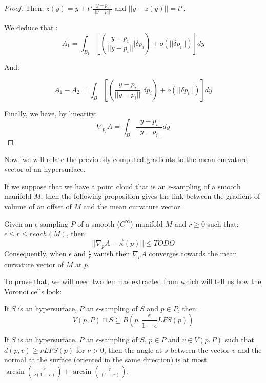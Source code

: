 \begin{proof}
Then, $ z(y) = y + t^{\star} \frac{y - p_i}{||y - p_i||} $ and $ || y - z(y) || =
t^{\star} $.

We deduce that :
$$ A_1 = \int_{B_1} \left[ \left( \frac{y - p_i}{||y - p_i||} | \delta p_i \right) +
o(||\delta p_i||) \right] dy $$

And:

$$ A_1 - A_2 = \int_{B} \left[ \left( \frac{y - p_i}{||y - p_i||} | \delta p_i \right)
+ o(||\delta p_i||) \right] dy $$

Finally, we have, by linearity:
$$ \nabla_{p_i} A = \int_{B} \frac{y - p_i}{||y - p_i||} dy $$

\end{proof}

Now, we will relate the previously computed gradients to the mean curvature
vector of an hypersurface.

If we suppose that we have a point cloud that is an $\epsilon$-sampling of
a smooth manifold $ M $, then the following proposition gives the link between
the gradient of volume of an offset of $ M $ and the mean curvature vector.

\begin{proposition}
    \label{prop:gradient-mean-curvature}
    Given an $\epsilon$-sampling $ P $ of a smooth ($ C^{\infty} $) manifold $ M $ and $ r \ge 0 $ such
    that: $ \epsilon \leq r \leq reach(M) $, then:
    $$ || \nabla_p A - \vec{\kappa}(p) || \leq TODO $$
    Consequently, when $ \epsilon $ and $ \frac{\epsilon}{r} $ vanish then
    $ \nabla_p A $ converges towards the mean curvature vector of $ M $ at $ p $.
\end{proposition}

To prove that, we will need two lemmas extracted from \cite{amenta1999surface}
which will tell us how the Voronoi cells look:
\begin{lemma}
    If $ S $ is an hypersurface, $ P $ an $\epsilon$-sampling of $ S $ and $ p
    \in P $, then:
    $$ V(p, P) \cap S \subseteq B\left(p, \frac{\epsilon}{1 - \epsilon}
        LFS(p)\right) $$
\end{lemma}

\begin{lemma}
    If $ S $ is an hypersurface, $ P $ an $\epsilon$-sampling of $ S $, $ p
    \in P $ and $ v \in V(p, P) $ such that $ d(p, v) \ge \nu LFS(p) $ for $ \nu
    > 0 $, then the angle at $ s $ between the vector $ v $ and the normal at
    the surface (oriented in the same direction) is at most $
    \arcsin(\frac{r}{\nu(1-r)}) + \arcsin(\frac{r}{(1-r)}) $.
\end{lemma}

